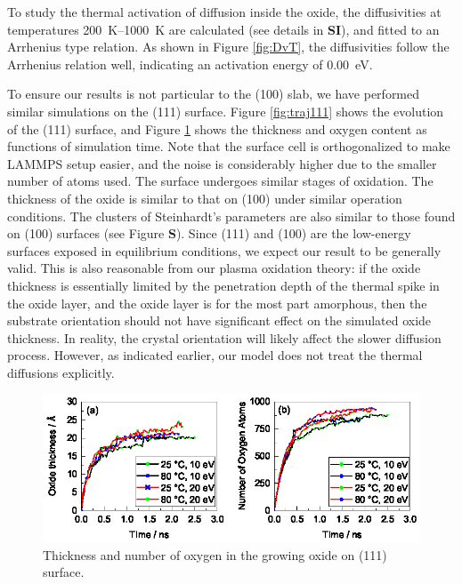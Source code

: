 \documentclass[manuscript=cmatex]{achemso}
\begin{document}
To study the thermal activation of diffusion inside the oxide, the diffusivities at temperatures \SIrange{200}{1000}{K} are calculated (see details in \textbf{SI}), and fitted to an Arrhenius type relation. As shown in Figure \ref{fig:DvT}, the diffusivities follow the Arrhenius relation well, indicating an activation energy of \SI{0.00}{eV}. 

To ensure our results is not particular to the  (100) slab, we have performed similar simulations on the  (111) surface. Figure \ref{fig:traj111} shows the evolution of the (111) surface, and Figure \ref{fig:thicknumo_111} shows the thickness and oxygen content as functions of simulation time. Note that the surface cell is orthogonalized to make LAMMPS setup easier, and the noise is considerably higher due to the smaller number of atoms used. The surface undergoes similar stages of oxidation. The thickness of the oxide is similar to that on (100) under similar operation conditions. The clusters of Steinhardt's parameters are also similar to those found on (100) surfaces (see Figure \textbf{S}). Since (111) and (100) are the low-energy surfaces exposed in equilibrium conditions, we expect our result to be generally valid. This is also reasonable from our plasma oxidation theory: if the oxide thickness is essentially limited by the penetration depth of the thermal spike in the oxide layer, and the oxide layer is for the most part amorphous, then the substrate orientation should not have significant effect on the simulated oxide thickness. In reality, the crystal orientation will likely affect the slower diffusion process. However, as indicated earlier, our model does not treat the thermal diffusions explicitly. 

\begin{figure}[h]
  \centering
  \includegraphics[width=\textwidth]{thicknumo_111.eps}
  \caption[Steinhardt's order parameter for slab]{Thickness and number of oxygen in the growing oxide on  (111) surface. }
  \label{fig:thicknumo_111}
\end{figure}
\end{document}
